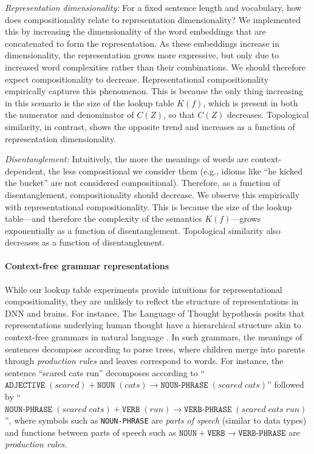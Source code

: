 \documentclass{article} %
\newcommand{\comp}{representational compositionality}
\newcommand{\Comp}{Representational compositionality}
\begin{document}
\textit{Representation dimensionality:} For a fixed sentence length and vocabulary, how does compositionality relate to representation dimensionality? We implemented this by increasing the dimensionality of the word embeddings that are concatenated to form the representation. As these embeddings increase in dimensionality, the representation grows more expressive, but only due to increased word complexities rather than their combinations. We should therefore expect compositionality to decrease. \Comp{} empirically captures this phenomenon. This is because the only thing increasing in this scenario is the size of the lookup table $K(f)$, which is present in both the numerator and denominator of $C(Z)$, so that $C(Z)$ decreases. Topological similarity, in contrast, shows the opposite trend and increases as a function of representation dimensionality.


\textit{Disentanglement:} Intuitively, the more the meanings of words are context-dependent, the less compositional we consider them (e.g., idioms like ``he kicked the bucket'' are not considered compositional). Therefore, as a function of disentanglement, compositionality should decrease. We observe this empirically with \comp{}. This is because the size of the lookup table---and therefore the complexity of the semantics $K(f)$---grows exponentially as a function of disentanglement. Topological similarity also decreases as a function of disentanglement.

\paragraph{Context-free grammar representations} 

While our lookup table experiments provide intuitions for \comp{}, they are unlikely to reflect the structure of representations in DNN and brains. For instance, The Language of Thought hypothesis \citep{fodor1975language} posits that representations underlying human thought have a hierarchical structure akin to context-free grammars in natural language \citep{chomsky1956three}. In such grammars, the meanings of sentences decompose according to parse trees, where children merge into parents through \emph{production rules} and leaves correspond to words. For instance, the sentence ``scared cats run'' decomposes according to ``$\texttt{ADJECTIVE} \; (scared) + \texttt{NOUN} \; (cats) \rightarrow \texttt{NOUN-PHRASE} \; (scared \; cats)$'' followed by ``$\texttt{NOUN-PHRASE} \; (scared \; cats) + \texttt{VERB} \; (run) \rightarrow \texttt{VERB-PHRASE} \; (scared \; cats \; run)$'', where symbols such as \texttt{NOUN-PHRASE} are \emph{parts of speech} (similar to data types) and functions between parts of speech such as $\texttt{NOUN} + \texttt{VERB} \rightarrow \texttt{VERB-PHRASE}$ are \emph{production rules}.
\end{document}
